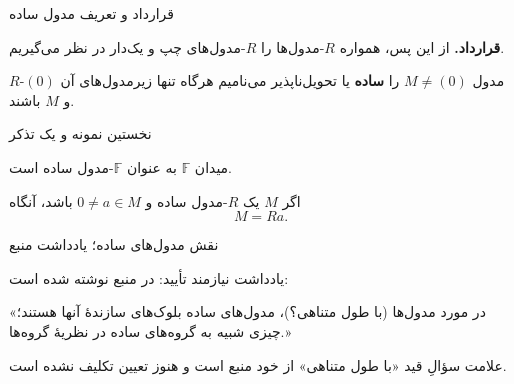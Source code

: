 \begin{frame}[t]{قرارداد و تعریف مدول ساده}
    \label{lec05:simple-definition}
    \begin{remark}
        \textbf{قرارداد.} از این پس، همواره $R$-مدول‌ها را
        $R$-مدول‌های \alert{چپ و یک‌دار} در نظر می‌گیریم.
    \end{remark}
    \begin{definition}
        $R$-مدول $M\neq(0)$ را \textbf{ساده} یا \alert{تحویل‌ناپذیر} می‌نامیم
        هرگاه تنها زیرمدول‌های آن $(0)$ و $M$ باشند.
    \end{definition}
\end{frame}

\begin{frame}[t]{نخستین نمونه و یک تذکر}
    \label{lec05:field-and-cyclic}
    \begin{example}
        میدان $\mathbb{F}$ به عنوان $\mathbb{F}$-مدول ساده است.
    \end{example}
    \begin{remark}
        اگر $M$ یک $R$-مدول ساده و $0\neq a\in M$ باشد، آنگاه
        \[
            M=Ra.
        \]
    \end{remark}
\end{frame}

\begin{frame}[t]{نقش مدول‌های ساده؛ یادداشت منبع}
    \label{lec05:building-blocks-pending}
    \begin{alertblock}{یادداشت نیازمند تأیید: }
        در منبع نوشته شده است:

        «در مورد مدول‌ها (با طول متناهی؟)، مدول‌های ساده بلوک‌های
        سازندهٔ آنها هستند؛ چیزی شبیه به گروه‌های ساده در نظریهٔ گروه‌ها.»

        علامت سؤالِ قید «با طول متناهی» از خود منبع است و هنوز تعیین تکلیف نشده است.
    \end{alertblock}
\end{frame}

